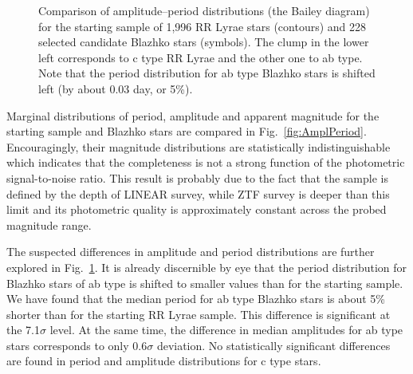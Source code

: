 \begin{figure}[ht]
    \centering
    \caption{Comparison of amplitude--period distributions (the Bailey
      diagram) for the starting sample of 1,996 RR Lyrae stars (contours)
        and 228 selected candidate Blazhko stars (symbols). The clump
        in the lower left corresponds to c type RR Lyrae and the
        other one to ab type. Note that the period distribution for ab
      type Blazhko stars is shifted left (by about 0.03 day, or 5\%).}
      \label{fig:AmplPeriod2D}
\end{figure}

 
Marginal distributions of  period, amplitude and apparent magnitude
for the starting sample and Blazhko stars are compared in Fig.~\ref{fig:AmplPeriod}. 
Encouragingly, their magnitude distributions are statistically
indistinguishable which indicates that the completeness is not a
strong function of the photometric signal-to-noise ratio. This
result is probably due to the fact that the sample is defined by the
depth of LINEAR survey, while ZTF survey is deeper than this limit and
its photometric quality is approximately constant across the probed
magnitude range. 

The suspected differences in amplitude and period distributions are
further explored in Fig.~\ref{fig:AmplPeriod2D}. It is already
discernible by eye that the period distribution for Blazhko stars of
ab type is shifted to smaller values than for the starting sample. We have
found that the median period for ab type Blazhko stars is about 5\% shorter
than for the starting RR Lyrae sample. This difference is significant at
the 7.1$\sigma$ level.  At the same time, the difference in median
amplitudes for ab type stars corresponds to only 0.6$\sigma$ deviation. 
No statistically significant differences are found in period and
amplitude distributions for c type stars. 


